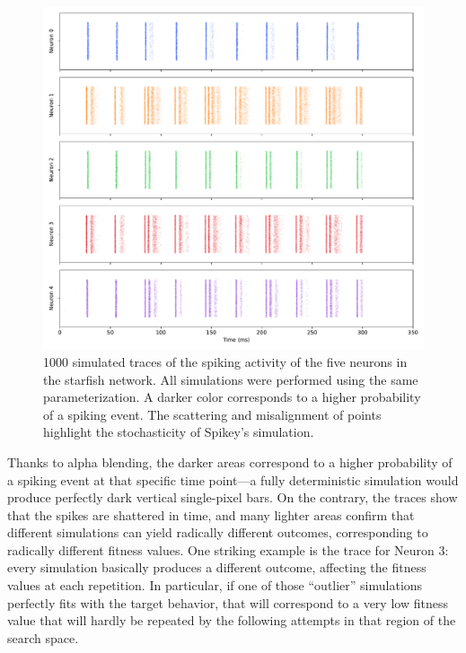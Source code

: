 \documentclass[utf8]{frontiersFPHY} %
\begin{document}
\begin{figure}[!ht]
    \centering
    \includegraphics[width=\textwidth]{images/failed-starfish/distribution-firing-light.pdf}
    \caption{1000 simulated traces of the spiking activity of the five neurons in the starfish network. All simulations were performed using the same parameterization. A darker color corresponds to a higher probability of a spiking event. The scattering and misalignment of points highlight the stochasticity of Spikey's simulation.}
    \label{fig:distributionfiring}
\end{figure}

Thanks to alpha blending, the darker areas correspond to a higher probability of a spiking event at that specific time point---a fully deterministic simulation would produce perfectly dark vertical single-pixel bars.
On the contrary, the traces show that the spikes are shattered
in time, and many lighter areas confirm that different simulations can yield radically different outcomes, corresponding to radically different fitness values.
One striking example is the trace for Neuron 3: every simulation basically produces a different outcome, affecting the fitness values at each repetition. 
In particular, if one of those ``outlier'' simulations perfectly fits with the target behavior, that will correspond to a very low fitness value that will hardly be repeated by the following attempts in that region of the search space. 
\end{document}
